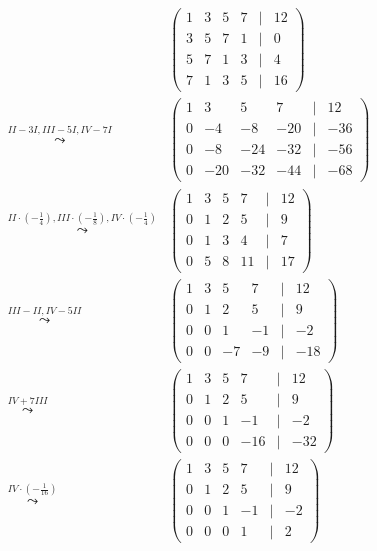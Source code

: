 \documentclass[a4paper,12pt]{article}
\begin{document}
\[
    \begin{aligned}
                                                                                 & \begin{pmatrix}1&3&5&7&|&12\\3&5&7&1&|&0\\5&7&1&3&|&4\\7&1&3&5&|&16\end{pmatrix}                       \\
        \overset{II-3I,III-5I,IV-7I}\leadsto                                     & \begin{pmatrix}1&3&5&7&|&12\\0&-4&-8&-20&|&-36\\0&-8&-24&-32&|&-56\\0&-20&-32&-44&|&-68\end{pmatrix}   \\
        \overset{II\cdot(-\frac14),III\cdot(-\frac18),IV\cdot(-\frac14)}\leadsto & \begin{pmatrix}1&3&5&7&|&12\\0&1&2&5&|&9\\0&1&3&4&|&7\\0&5&8&11&|&17\end{pmatrix}                      \\
        \overset{III-II,IV-5II}\leadsto                                          & \begin{pmatrix}1&3&5&7&|&12\\0&1&2&5&|&9\\0&0&1&-1&|&-2\\0&0&-7&-9&|&-18\end{pmatrix}                  \\
        \overset{IV+7III}\leadsto                                                & \begin{pmatrix}1&3&5&7&|&12\\0&1&2&5&|&9\\0&0&1&-1&|&-2\\0&0&0&-16&|&-32\end{pmatrix}                  \\
        \overset{IV\cdot(-\frac1{16})}\leadsto                                   & \begin{pmatrix}1&3&5&7&|&12\\0&1&2&5&|&9\\0&0&1&-1&|&-2\\0&0&0&1&|&2\end{pmatrix}                      \\

\end{aligned}\]
\end{document}
